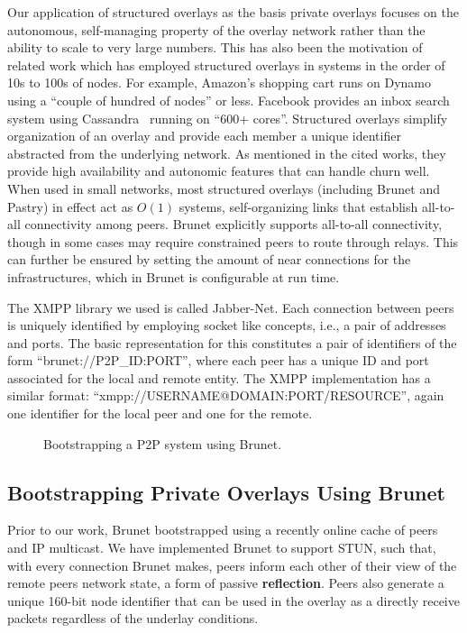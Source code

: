 \documentclass[conference]{IEEEtran}
\begin{document}
Our application of structured overlays as the basis private overlays focuses on
the autonomous, self-managing property of the overlay network rather than the
ability to scale to very large numbers.  This has also been the motivation of
related work which has employed structured overlays in systems in the order of
10s to 100s of nodes.  For example, Amazon's shopping cart runs on
Dynamo~\cite{dynamo} using a ``couple of hundred of nodes'' or less.  Facebook
provides an inbox search system using Cassandra~\cite{cassandra} running on
``600+ cores''.  Structured overlays simplify organization of an overlay and
provide each member a unique identifier abstracted from the underlying network.
As mentioned in the cited works, they provide high availability and autonomic
features that can handle churn well.  When used in small networks, most
structured overlays (including Brunet and Pastry) in effect act as $O(1)$
systems, self-organizing links that establish all-to-all connectivity among
peers.  Brunet explicitly supports all-to-all connectivity, though in some
cases may require constrained peers to route through relays.  This can further
be ensured by setting the amount of near connections for the infrastructures,
which in Brunet is configurable at run time.

The XMPP library we used is called Jabber-Net.  Each connection between peers
is uniquely identified by employing socket like concepts, i.e., a pair of
addresses and ports.  The basic representation for this constitutes a pair of
identifiers of the form ``brunet://P2P\_ID:PORT'', where each peer has a
unique ID and port associated for the local and remote entity.  The XMPP
implementation has a similar format: ``xmpp://USERNAME@DOMAIN:PORT/RESOURCE'',
again one identifier for the local peer and one for the remote.

\begin{figure*}[h!t!]
\centering
{}
\caption{Bootstrapping a P2P system using Brunet.}
\label{fig:bootstrap_brunet}
\end{figure*}

\subsection{Bootstrapping Private Overlays Using Brunet}
\label{brunet_bootstrapping}

Prior to our work, Brunet bootstrapped using a recently online cache of peers
and IP multicast.  We have implemented Brunet to support STUN, such that, with
every connection Brunet makes, peers inform each other of their view of the
remote peers network state, a form of passive \textbf{reflection}.  Peers also
generate a unique 160-bit node identifier that can be used in the overlay as a
directly receive packets regardless of the underlay conditions.
\end{document}
